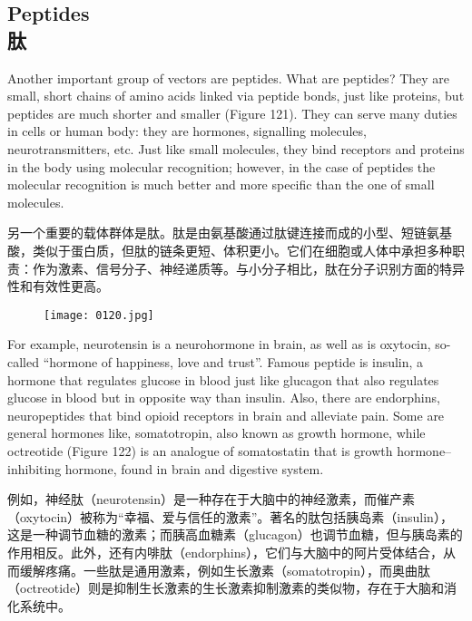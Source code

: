 \documentclass[dvipsnames, svgnames,a4paper,11pt]{article}
\begin{document}
\subsection{Peptides \\肽}

Another important group of vectors are peptides. What are peptides? They are small,
short chains of amino acids linked via peptide bonds, just like proteins, but peptides
are much shorter and smaller (Figure 121). They can serve many duties in cells or
human body: they are hormones, signalling molecules, neurotransmitters, etc. Just
like small molecules, they bind receptors and proteins in the body using molecular
recognition; however, in the case of peptides the molecular recognition is much
better and more specific than the one of small molecules.

另一个重要的载体群体是肽。肽是由氨基酸通过肽键连接而成的小型、短链氨基酸，类似于蛋白质，但肽的链条更短、体积更小。它们在细胞或人体中承担多种职责：作为激素、信号分子、神经递质等。与小分子相比，肽在分子识别方面的特异性和有效性更高。

\begin{figure}[h]
    \centering
    \texttt{[image: 0120.jpg]}
     \label{fig121}
\end{figure}

For example, neurotensin is a neurohormone in brain, as well as is oxytocin, so-
called “hormone of happiness, love and trust”. Famous peptide is insulin, a hormone
that regulates glucose in blood just like glucagon that also regulates glucose in blood
but in opposite way than insulin. Also, there are endorphins, neuropeptides that bind
opioid receptors in brain and alleviate pain. Some are general hormones like,
somatotropin, also known as growth hormone, while octreotide (Figure 122) is an
analogue of somatostatin that is growth hormone–inhibiting hormone, found in brain
and digestive system.

例如，神经肽（neurotensin）是一种存在于大脑中的神经激素，而催产素（oxytocin）被称为“幸福、爱与信任的激素”。著名的肽包括胰岛素（insulin），这是一种调节血糖的激素；而胰高血糖素（glucagon）也调节血糖，但与胰岛素的作用相反。此外，还有内啡肽（endorphins），它们与大脑中的阿片受体结合，从而缓解疼痛。一些肽是通用激素，例如生长激素（somatotropin），而奥曲肽（octreotide）则是抑制生长激素的生长激素抑制激素的类似物，存在于大脑和消化系统中。
\end{document}
